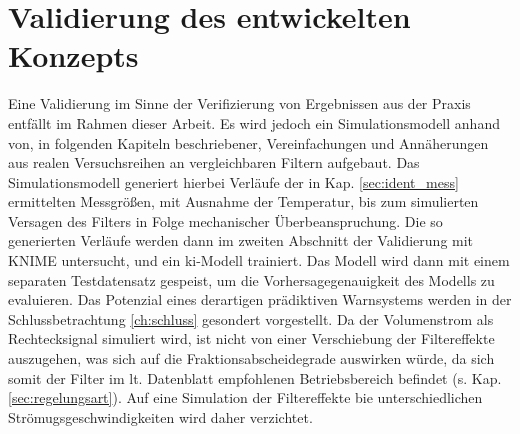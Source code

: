 \chapter{Validierung des entwickelten Konzepts}
\label{ch:validierung}
Eine Validierung im Sinne der Verifizierung von Ergebnissen aus der Praxis entfällt im Rahmen dieser Arbeit. Es wird jedoch ein Simulationsmodell anhand von, in folgenden Kapiteln beschriebener, Vereinfachungen und Annäherungen aus realen Versuchsreihen an vergleichbaren Filtern aufgebaut. Das Simulationsmodell generiert hierbei Verläufe der in Kap. \ref{sec:ident_mess} ermittelten Messgrößen, mit Ausnahme der Temperatur, bis zum simulierten Versagen des Filters in Folge mechanischer Überbeanspruchung. Die so generierten Verläufe werden dann im zweiten Abschnitt der Validierung mit \ac{KNIME} untersucht, und ein \ac{ki}-Modell trainiert. Das Modell wird dann mit einem separaten Testdatensatz gespeist, um die Vorhersagegenauigkeit des Modells zu evaluieren. Das Potenzial eines derartigen prädiktiven Warnsystems werden in der Schlussbetrachtung \ref{ch:schluss} gesondert vorgestellt.
Da der Volumenstrom als Rechtecksignal simuliert wird, ist nicht von einer Verschiebung der Filtereffekte auszugehen, was sich auf die Fraktionsabscheidegrade auswirken würde, da sich somit der Filter im lt. Datenblatt empfohlenen Betriebsbereich befindet (s. Kap. \ref{sec:regelungsart}). Auf eine Simulation der Filtereffekte bie unterschiedlichen Strömugsgeschwindigkeiten wird daher verzichtet.
